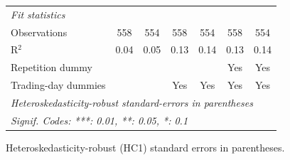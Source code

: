 \begin{tabular}{lcccccc}
   \midrule
   \emph{Fit statistics}\\
   Observations           & 558            & 554            & 558            & 554            & 558            & 554\\  
   R$^2$                  & 0.04           & 0.05           & 0.13           & 0.14           & 0.13           & 0.14\\  
   Repetition dummy       &                &                &                &                & Yes            & Yes\\  
   Trading-day dummies    &                &                & Yes            & Yes            & Yes            & Yes\\  
   \midrule \midrule
   \multicolumn{7}{l}{\emph{Heteroskedasticity-robust standard-errors in parentheses}}\\
   \multicolumn{7}{l}{\emph{Signif. Codes: ***: 0.01, **: 0.05, *: 0.1}}\\
\end{tabular}
 
\par \raggedright 
Heteroskedasticity-robust (HC1) standard errors in parentheses.
\par\endgroup
